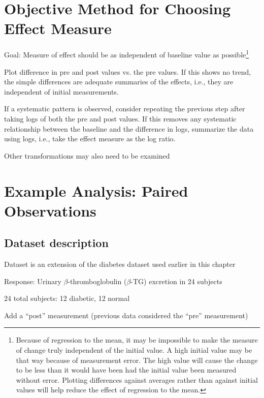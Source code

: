 \section{Objective Method for Choosing Effect Measure}
\bi
\item   Goal: Measure of effect should be as independent of
        baseline value as possible\footnote{Because of regression to
        the mean, it may be impossible to make the measure of change
        truly independent of the initial value.  A high initial value
        may be that way because of measurement error.  The high value will
        cause the change to be less than it would have been had the
        initial value been measured without error.  Plotting
        differences against averages rather than against initial
        values will help reduce the effect of regression to the mean.}
\item   Plot difference in pre and post values vs. the pre values.  If this shows no trend, the simple
        differences are adequate summaries of the effects, i.e., they
        are independent of initial measurements.
\item   If a systematic pattern is observed, consider repeating the
        previous step after taking logs of both the pre and post
        values.  If this removes any systematic relationship between
        the baseline and the difference in logs, summarize the data
        using logs, i.e., take the effect measure as the log ratio.
\item   Other transformations may also need to be examined
\ei


\section{Example Analysis: Paired Observations}

\subsection{Dataset description}
\bi
  \item Dataset is an extension of the diabetes dataset used earlier in this chapter
  \item Response: Urinary $\beta$-thromboglobulin ($\beta$-TG) excretion in 24 subjects
  \item 24 total subjects: 12 diabetic, 12 normal
  \item Add a ``post'' measurement (previous data considered the ``pre'' measurement)
\ei

